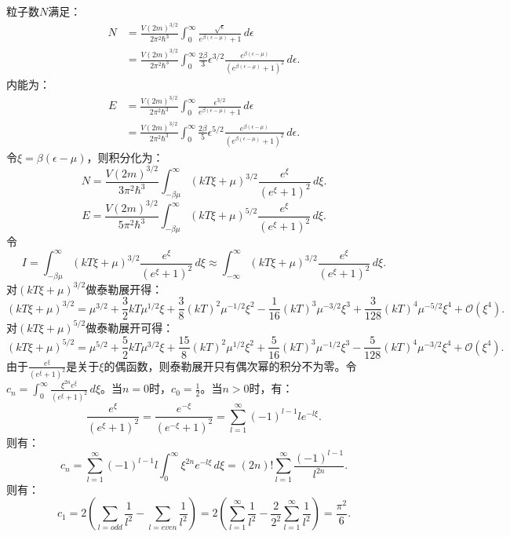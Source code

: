 \documentclass[reqno,a4paper,12pt]{amsart}
\begin{document}
\begin{tcolorbox}[breakable, colback = black!5!white, colframe = black]
粒子数$N$满足：
\begin{align*}
	N &= \frac{V(2m)^{3/2}}{2\pi^2\hbar^3} \int_0^{\infty} \frac{\sqrt{\epsilon}}{e^{\beta(\epsilon-\mu)}+1} \,d\epsilon \\
	&= \frac{V(2m)^{3/2}}{2\pi^2\hbar^3} \int_0^{\infty} \frac{2\beta}{3} \epsilon^{3/2} \frac{e^{\beta(\epsilon-\mu)}}{\left( e^{\beta(\epsilon-\mu)} + 1 \right)^2} \,d\epsilon.
\end{align*}
内能为：
\begin{align*}
	E &= \frac{V(2m)^{3/2}}{2\pi^2\hbar^3}\int_0^{\infty} \frac{\epsilon^{3/2}}{e^{\beta(\epsilon - \mu)} + 1}\,d\epsilon \\ 
	&= \frac{V(2m)^{3/2}}{2\pi^2\hbar^3} \int_0^{\infty} \frac{2\beta}{5}\epsilon^{5/2} \frac{e^{\beta(\epsilon-\mu)}}{\left( e^{\beta(\epsilon-\mu)} + 1 \right)^2} \,d\epsilon.
\end{align*}
令$\xi = \beta(\epsilon - \mu)$，则积分化为：
\[
	N = \frac{V(2m)^{3/2}}{3\pi^2\hbar^3} \int_{-\beta\mu}^{\infty} (kT\xi+\mu)^{3/2} \frac{e^{\xi}}{(e^{\xi} + 1)^2}\,d\xi.
\]
\[
	E = \frac{V(2m)^{3/2}}{5\pi^2\hbar^3} \int_{-\beta\mu}^{\infty} (kT\xi + \mu)^{5/2} \frac{e^{\xi}}{(e^{\xi} + 1)^2}\,d\xi.
\]
令
\[
	I = \int_{-\beta\mu}^{\infty} (kT\xi+\mu)^{3/2} \frac{e^{\xi}}{(e^{\xi} + 1)^2}\,d\xi \approx \int_{-\infty}^{\infty} (kT\xi+\mu)^{3/2} \frac{e^{\xi}}{(e^{\xi} + 1)^2}\,d\xi.
\]
对$(kT\xi+\mu)^{3/2}$做泰勒展开得：
\[
	(kT\xi+\mu)^{3/2} = \mu^{3/2} + \frac{3}{2}kT\mu^{1/2}\xi + \frac{3}{8}(kT)^2\mu^{-1/2}\xi^2 - \frac{1}{16}(kT)^3\mu^{-3/2}\xi^3 + \frac{3}{128}(kT)^4\mu^{-5/2}\xi^4 + \mathcal{O}(\xi^4).
\]
对$(kT\xi+\mu)^{5/2}$做泰勒展开可得：
\[
	(kT\xi+\mu)^{5/2} = \mu^{5/2} + \frac{5}{2}kT\mu^{3/2}\xi + \frac{15}{8}(kT)^2\mu^{1/2}\xi^2 + \frac{5}{16}(kT)^3\mu^{-1/2}\xi^3 - \frac{5}{128}(kT)^4\mu^{-3/2}\xi^4+\mathcal{O}(\xi^4).
\]
由于$\frac{e^\xi}{(e^\xi + 1)^2}$是关于$\xi$的偶函数，则泰勒展开只有偶次幂的积分不为零。令$c_n = \int_0^{\infty} \frac{\xi^{2n}e^{\xi}}{(e^{\xi}+1)^2}\,d\xi$。当$n = 0$时，$c_0 = \frac{1}{2}$。当$n>0$时，有：
\[
	\frac{e^\xi}{(e^\xi + 1)^2} = \frac{e^{-\xi}}{(e^{-\xi} + 1)^2} = \sum_{l=1}^{\infty} (-1)^{l-1} l e^{-l\xi}.
\]
则有：
\[
	c_n = \sum_{l=1}^{\infty} (-1)^{l-1} l \int_0^{\infty} \xi^{2n}e^{-l\xi} \,d\xi = (2n)! \sum_{l=1}^{\infty} \frac{(-1)^{l-1}}{l^{2n}}.
\]
则有：
\[
	c_1 = 2\left( \sum_{l = odd} \frac{1}{l^2} - \sum_{l=even} \frac{1}{l^2} \right) = 2\left( \sum_{l=1}^{\infty} \frac{1}{l^2} - \frac{2}{2^2} \sum_{l=1}^{\infty} \frac{1}{l^2} \right) = \frac{\pi^2}{6}.
\]
\end{tcolorbox}
\end{document}
